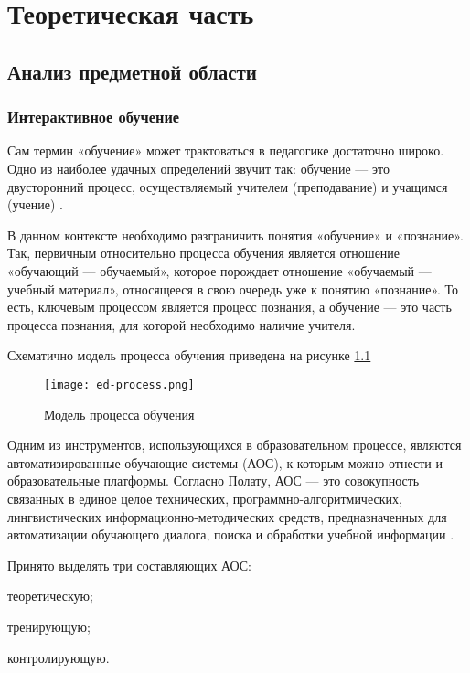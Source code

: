 \chapter{Теоретическая часть}

\section{Анализ предметной области}
\subsection{Интерактивное обучение}
Сам термин «обучение» может трактоваться в педагогике достаточно широко. Одно из наиболее удачных определений звучит так: обучение — это двусторонний процесс, осуществляемый учителем (преподавание) и учащимся (учение) \cite{pedDict}.

В данном контексте необходимо разграничить понятия «обучение» и «познание». Так, первичным относительно процесса обучения является отношение «обучающий — обучаемый», которое порождает отношение «обучаемый — учебный материал», относящееся в свою очередь уже к понятию «познание». То есть, ключевым процессом является процесс познания, а обучение — это часть процесса познания, для которой необходимо наличие учителя.

Схематично модель процесса обучения приведена на рисунке \ref{fig:ed-process}

\begin{figure}[htbp]
\centering
\texttt{[image: ed-process.png]}
\caption{Модель процесса обучения}%
\label{fig:ed-process}
\end{figure}

Одним из инструментов, использующихся в образовательном процессе, являются автоматизированные обучающие системы (АОС), к которым можно отнести и образовательные платформы. Согласно Полату, АОС — это совокупность связанных в единое целое технических, программно-алгоритмических, лингвистических информационно-методических средств, предназначенных для автоматизации обучающего диалога, поиска и обработки учебной информации \cite{Polat}.

Принято выделять три составляющих АОС:
\begin{itemize*}
\item теоретическую;
\item тренирующую;
\item контролирующую.
\end{itemize*}

